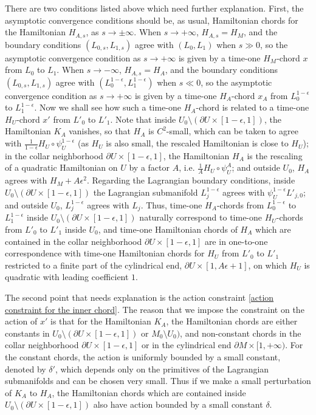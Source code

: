 \documentclass{amsart}
\numberwithin{equation}{section}
\numberwithin{figure}{section}
\begin{document}
	There are two conditions listed above which need further explanation. First, the asymptotic convergence conditions should be, as usual, Hamiltonian chords for the Hamiltonian $H_{A, s}$, as $s \to \pm \infty$. When $s \to +\infty$, $H_{A, s} = H_{M}$, and the boundary conditions $(L_{0, s}, L_{1, s})$ agree with $(L_{0}, L_{1})$ when $s \gg 0$, so the asymptotic convergence condition as $s \to +\infty$ is given by a time-one $H_{M}$-chord $x$ from $L_{0}$ to $L_{1}$. When $s \to -\infty$, $H_{A, s} = H_{A}$, and the boundary conditions $(L_{0, s}, L_{1, s})$ agree with $(L_{0}^{1-\epsilon}, L_{1}^{1-\epsilon})$ when $s \ll 0$, so the asymptotic convergence condition as $s \to +\infty$ is given by a time-one $H_{A}$-chord $x_{A}$ from $L_{0}^{1-\epsilon}$ to $L_{1}^{1-\epsilon}$. Now we shall see how such a time-one $H_{A}$-chord is related to a time-one $H_{U}$-chord $x'$ from $L'_{0}$ to $L'_{1}$. Note that inside $U_{0} \setminus (\partial U \times [1-\epsilon, 1])$, the Hamiltonian $K_{A}$ vanishes, so that $H_{A}$ is $C^{2}$-small, which can be taken to agree with $\frac{1}{1-\epsilon} H_{U} \circ \psi_{U}^{1-\epsilon}$ (as $H_{U}$ is also small, the rescaled Hamiltonian is close to $H_{U}$); in the collar neighborhood $\partial U \times [1-\epsilon, 1]$, the Hamiltonian $H_{A}$ is the rescaling of a quadratic Hamiltonian on $U$ by a factor $A$, i.e. $\frac{1}{A} H_{U} \circ \psi_{U}^{A}$; and outside $U_{0}$, $H_{A}$ agrees with $H_{M} + A \epsilon^{2}$. Regarding the Lagrangian boundary conditions, inside $U_{0} \setminus (\partial U \times [1-\epsilon, 1])$ the Lagrangian submanifold $L_{j}^{1-\epsilon}$ agrees with $\psi_{U}^{1-\epsilon}L'_{j, 0}$; and outside $U_{0}$, $L_{j}^{1-\epsilon}$ agrees with $L_{j}$. Thus, time-one $H_{A}$-chords from $L_{0}^{1-\epsilon}$ to $L_{1}^{1-\epsilon}$ inside $U_{0} \setminus (\partial U \times [1-\epsilon, 1])$ naturally correspond to time-one $H_{U}$-chords from $L'_{0}$ to $L'_{1}$ inside $U_{0}$, and time-one Hamiltonian chords of $H_{A}$ which are contained in the collar neighborhood $\partial U \times [1-\epsilon, 1]$ are in one-to-one correspondence with time-one Hamiltonian chords for $H_{U}$ from $L'_{0}$ to $L'_{1}$ restricted to a finite part of the cylindrical end, $\partial U \times [1, A\epsilon + 1]$, on which $H_{U}$  is quadratic with leading coefficient $1$. \par
	The second point that needs explanation is the action constraint \eqref{action constraint for the inner chord}. The reason that we impose the constraint on the action of $x'$ is that for the Hamiltonian $K_{A}$, the Hamiltonian chords are either constants in $U_{0} \setminus (\partial U \times [1-\epsilon, 1])$ or $M_{0} \setminus U_{0})$, and non-constant chords in the collar neighborhood $\partial U \times [1-\epsilon, 1]$ or in the cylindrical end $\partial M \times [1, +\infty)$. For the constant chords, the action is uniformly bounded by a small constant, denoted by $\delta'$, which depends only on the primitives of the Lagrangian submanifolds and can be chosen very small. Thus if we make a small perturbation of $K_{A}$ to $H_{A}$, the Hamiltonian chords which are contained inside $U_{0} \setminus (\partial U \times [1-\epsilon, 1])$ also have action bounded by a small constant $\delta$.
\end{document}
